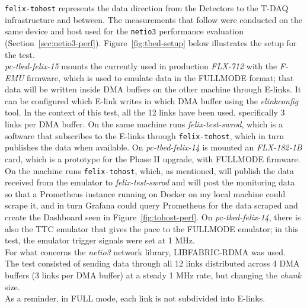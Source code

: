 \texttt{felix-tohost} represents the data direction from the Detectors to the T-DAQ infrastructure and between. The measurements that follow were conducted on the same device and host used for the \texttt{netio3} performance evaluation (Section~\ref{sec:netio3-perf}). 
Figure~\ref{fig:tbed-setup} below illustrates the setup for the test.\\
\emph{pc-tbed-felix-15} mounts the currently used in production \emph{FLX-712} with the \emph{F-EMU} firmware, which is used to emulate data in the FULLMODE format; that data will be written inside \acs{DMA} buffers on the other machine through \acs{E-link}s. It can be configured which \acs{E-link} writes in which \acs{DMA} buffer using the \emph{elinkconfig} tool. In the context of this test, all the 12 links have been used, specifically 3 links per \acs{DMA} buffer. 
On the same machine runs \emph{felix-test-swrod}, which is a software that subscribes to the \acs{E-link}s through \texttt{felix-tohost}, which in turn publishes the data when available.
On \emph{pc-tbed-felix-14} is mounted an \emph{FLX-182-1B} card, which is a prototype for the Phase II upgrade, with FULLMODE firmware. On the machine runs \texttt{felix-tohost}, which, as mentioned, will publish the data received from the emulator to \emph{felix-test-swrod} and will post the monitoring data so that a Prometheus instance running on Docker on my local machine could scrape it, and in turn Grafana could query Prometheus for the data scraped and create the Dashboard seen in Figure~\ref{fig:tohost-perf}. On \emph{pc-tbed-felix-14}, there is also the \acl{TTC} emulator that gives the pace to the FULLMODE emulator; in this test, the emulator trigger signals were set at 1 MHz.\\
For what concerns the \emph{netio3} network library, LIBFABRIC-RDMA was used.\\
The test consisted of sending data through all 12 links distributed across 4 \acs{DMA} buffers (3 links per \acs{DMA} buffer) at a steady 1 MHz rate, but changing the \emph{chunk} size.\\
As a reminder, in FULL mode, each link is not subdivided into \acs{E-link}s.

